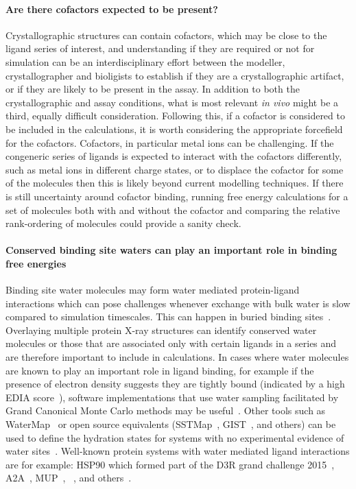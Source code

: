 \documentclass[9pt,bestpractices]{livecoms}
\begin{document}
\paragraph{Are there cofactors expected to be present?}
Crystallographic structures can contain cofactors, which may be close to the ligand series of interest, and understanding if they are required or not for simulation can be an interdisciplinary effort between the modeller, crystallographer and bioligists to establish if they are a crystallographic artifact, or if they are likely to be present in the assay. In addition to both the crystallographic and assay conditions, what is most relevant \textit{in vivo} might be a third, equally difficult consideration. Following this, if a cofactor is considered to be included in the calculations, it is worth considering the appropriate forcefield for the cofactors. Cofactors, in particular metal ions can be challenging\cite{mobley2017predicting, guven2024protocols}. If the congeneric series of ligands is expected to interact with the cofactors differently, such as metal ions in different charge states, or to displace the cofactor for some of the molecules then this is likely beyond current modelling techniques. If there is still uncertainty around cofactor binding, running free energy calculations for a set of molecules both with and without the cofactor and comparing the relative rank-ordering of molecules could provide a sanity check.
 

\paragraph{Conserved binding site waters can play an important role in binding free energies}
Binding site water molecules may form water mediated protein-ligand interactions which can pose challenges whenever exchange with bulk water is slow compared to simulation timescales. This can happen in buried binding sites~\cite{laage2017water}. Overlaying multiple protein X-ray structures can identify conserved water molecules or those that are associated only with certain ligands in a series and are therefore important to include in calculations. In cases where water molecules are known to play an important role in ligand binding, for example if the presence of electron density suggests they are tightly bound (indicated by a high EDIA score~\cite{nittinger2015evidence,meyder2017estimating}), software implementations that use water sampling facilitated by Grand Canonical Monte Carlo methods may be useful~\cite{michel2010prediction}. Other tools such as WaterMap~\cite{abel2008role,young2007motifs} or open source equivalents (SSTMap~\cite{haider2018solvation}, GIST~\cite{ramsey2016solvation}, and others) can be used to define the hydration states for systems with no experimental evidence of water sites~\cite{wang2011ligand}. Well-known protein systems with water mediated ligand interactions are for example: HSP90 which formed part of the D3R grand challenge 2015~\cite{mey2016blinded}, A2A~\cite{brucemacdonald2018ligand}, MUP~\cite{ross2015water}, ~\cite{deflorian2020accurate}, and others~\cite{michel2009energetics}.
\end{document}
